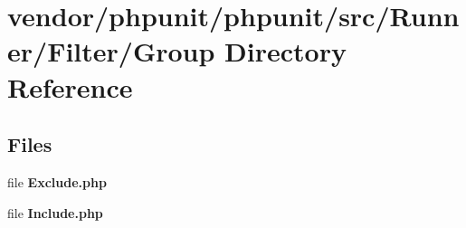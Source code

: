 \section{vendor/phpunit/phpunit/src/\+Runner/\+Filter/\+Group Directory Reference}
\label{dir_1acc071a74444e2ff60dd796a9c47b9b}
\subsection*{Files}
\begin{DoxyCompactItemize}
\item 
file {\bf Exclude.\+php}
\item 
file {\bf Include.\+php}
\end{DoxyCompactItemize}
